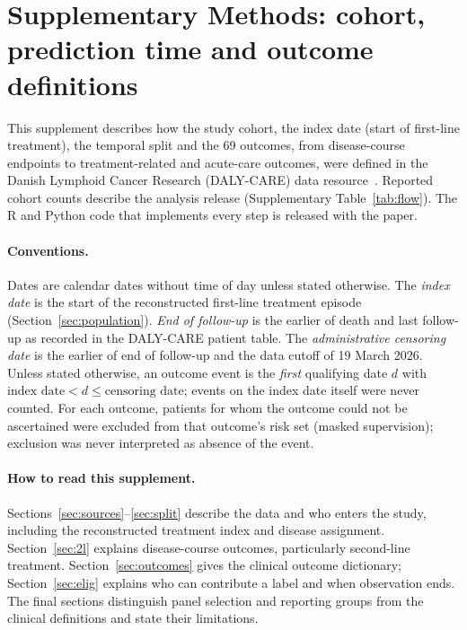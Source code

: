 \documentclass[10pt]{article}
\begin{document}
\ifdefined\embeddedSupplement\pagestyle{empty}\fi
\section*{Supplementary Methods: cohort, prediction time and outcome definitions}

This supplement describes how the study cohort, the index date (start of
first-line treatment), the temporal split and the 69 outcomes, from
disease-course endpoints to treatment-related and acute-care outcomes, were
defined in the Danish
Lymphoid Cancer Research (DALY-CARE) data resource~\citep{brieghel2025dalycare}.
Reported cohort counts describe the analysis release (Supplementary Table~\ref{tab:flow}).
The R and Python code that implements every step is released with the paper.

\paragraph{Conventions.} Dates are calendar dates without time of day unless
stated otherwise. The \emph{index date} is the start of the reconstructed
first-line treatment episode (Section~\ref{sec:population}). \emph{End of
follow-up} is the earlier of death and last follow-up as recorded in the
DALY-CARE patient table. The \emph{administrative censoring date} is the
earlier of end of follow-up and the data cutoff of 19 March 2026. Unless stated
otherwise, an outcome event is the \emph{first} qualifying date $d$ with
$\text{index date} < d \le \text{censoring date}$; events on the index date
itself were never counted. For each outcome, patients for whom the outcome
could not be ascertained were excluded from that outcome's risk set (masked
supervision); exclusion was never interpreted as absence of the event.

\paragraph{How to read this supplement.}
Sections~\ref{sec:sources}--\ref{sec:split} describe the data and who enters the
study, including the reconstructed treatment index and disease assignment.
Section~\ref{sec:2l} explains disease-course outcomes, particularly second-line
treatment. Section~\ref{sec:outcomes} gives the clinical outcome dictionary;
Section~\ref{sec:elig} explains who can contribute a label and when observation
ends. The final sections distinguish panel selection and reporting groups from
the clinical definitions and state their limitations.
\end{document}
